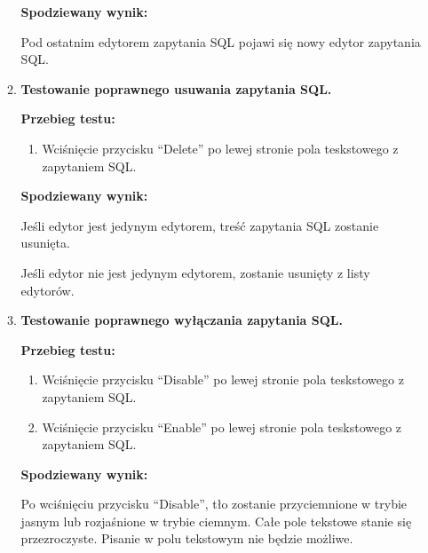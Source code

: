\begin{enumerate}
\begin{enumerate}
\begin{enumerate}
                \end{enumerate}

                \textbf{Spodziewany wynik:}

                Pod ostatnim edytorem zapytania SQL pojawi się nowy edytor
                zapytania SQL.


            \item \textbf{Testowanie poprawnego usuwania zapytania SQL.}

                \textbf{Przebieg testu:}

                \begin{enumerate}

                    \item Wciśnięcie przycisku ``Delete'' po lewej stronie pola
                        teskstowego z zapytaniem SQL.

                \end{enumerate}

                \textbf{Spodziewany wynik:}

                Jeśli edytor jest jedynym edytorem, treść zapytania SQL zostanie
                usunięta.

                Jeśli edytor nie jest jedynym edytorem, zostanie usunięty z
                listy edytorów.

            \item \textbf{Testowanie poprawnego wyłączania zapytania SQL.}

                \textbf{Przebieg testu:}

                \begin{enumerate}

                    \item Wciśnięcie przycisku ``Disable'' po lewej stronie pola
                        teskstowego z zapytaniem SQL.

                    \item Wciśnięcie przycisku ``Enable'' po lewej stronie pola
                        teskstowego z zapytaniem SQL.

                \end{enumerate}

                \textbf{Spodziewany wynik:}

                Po wciśnięciu przycisku ``Disable'', tło zostanie przyciemnione w
                trybie jasnym lub rozjaśnione w trybie ciemnym. Całe pole
                tekstowe stanie się przezroczyste. Pisanie w polu tekstowym nie
                będzie możliwe.


\end{enumerate}
\end{enumerate}
